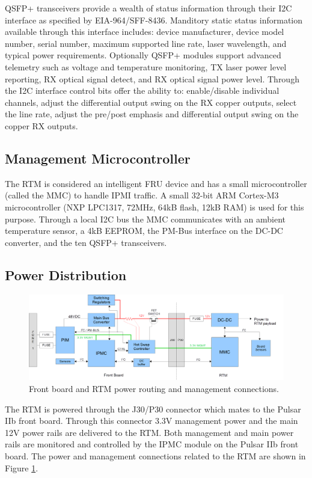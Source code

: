 \documentclass[letterpaper]{article}
\begin{document}
QSFP+ transceivers provide a wealth of status information through their I2C interface as specified by EIA-964/SFF-8436\cite{qsfp}.  Manditory static status information available through this interface includes: device manufacturer, device model number, serial number, maximum supported line rate, laser wavelength, and typical power requirements. Optionally QSFP+ modules support advanced telemetry such as voltage and temperature monitoring, TX laser power level reporting, RX optical signal detect, and RX optical signal power level.  Through the I2C interface control bits offer the ability to: enable/disable individual channels, adjust the differential output swing on the RX copper outputs, select the line rate, adjust the pre/post emphasis and differential output swing on the copper RX outputs.

\subsection{Management Microcontroller}

The RTM is considered an intelligent FRU device and has a small microcontroller (called the MMC) to handle IPMI traffic.  A small 32-bit ARM Cortex-M3 microcontroller (NXP LPC1317, 72MHz, 64kB flash, 12kB RAM) is used for this purpose.  Through a local I2C bus the MMC communicates with an ambient temperature sensor, a 4kB EEPROM, the PM-Bus interface on the DC-DC converter, and the ten QSFP+ transceivers.

\subsection{Power Distribution}

\begin{figure}
\centering
\includegraphics[width=14cm]{rtm_pwr.png}
\caption{Front board and RTM power routing and management connections.}
\label{rtm_pwr}
\end{figure}

The RTM is powered through the J30/P30 connector which mates to the Pulsar IIb front board.  Through this connector 3.3V management power and the main 12V power rails are delivered to the RTM.  Both management and main power rails are monitored and controlled by the IPMC module on the Pulsar IIb front board.  The power and management connections related to the RTM are shown in Figure \ref{rtm_pwr}.
\end{document}
